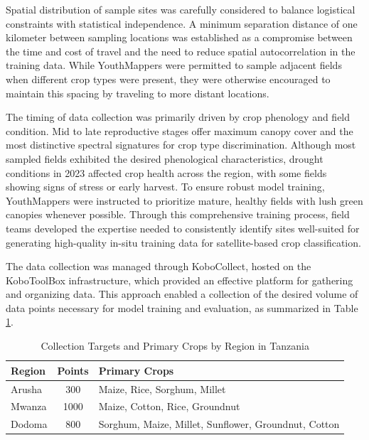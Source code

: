 \documentclass[
  journal,
  twocolumn]{IEEEtran}
\begin{document}
Spatial distribution of sample sites was carefully considered to balance
logistical constraints with statistical independence. A minimum
separation distance of one kilometer between sampling locations was
established as a compromise between the time and cost of travel and the
need to reduce spatial autocorrelation in the training data. While
YouthMappers were permitted to sample adjacent fields when different
crop types were present, they were otherwise encouraged to maintain this
spacing by traveling to more distant locations.

The timing of data collection was primarily driven by crop phenology and
field condition. Mid to late reproductive stages offer maximum canopy
cover and the most distinctive spectral signatures for crop type
discrimination. Although most sampled fields exhibited the desired
phenological characteristics, drought conditions in 2023 affected crop
health across the region, with some fields showing signs of stress or
early harvest. To ensure robust model training, YouthMappers were
instructed to prioritize mature, healthy fields with lush green canopies
whenever possible. Through this comprehensive training process, field
teams developed the expertise needed to consistently identify sites
well-suited for generating high-quality in-situ training data for
satellite-based crop classification.

The data collection was managed through KoboCollect, hosted on the
KoboToolBox infrastructure, which provided an effective platform for
gathering and organizing data. This approach enabled a collection of the
desired volume of data points necessary for model training and
evaluation, as summarized in Table \ref{tab:data_n}.

\begin{table}[h!]
\centering
\small
\begin{tabular}{@{}lcp{4.5cm}@{}}
\toprule
\textbf{Region} & \textbf{Points} & \textbf{Primary Crops} \\
\midrule
Arusha & 300 & Maize, Rice, Sorghum, Millet \\
\midrule
Mwanza & 1000 & Maize, Cotton, Rice, Groundnut \\
\midrule
Dodoma & 800 & Sorghum, Maize, Millet, Sunflower, Groundnut, Cotton \\
\bottomrule
\end{tabular}
\caption{Collection Targets and Primary Crops by Region in Tanzania}
\label{tab:data_n}
\end{table}
\end{document}
